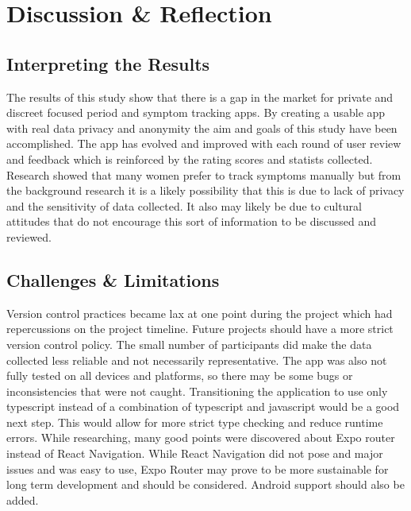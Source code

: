 \section{Discussion \& Reflection}

\subsection{Interpreting the Results}
The results of this study show that there is a gap in the market for private and discreet focused period and symptom tracking apps. By creating a usable app with real data privacy and anonymity the aim and goals of this study have been accomplished. The app has evolved and improved with each round of user review and feedback which is reinforced by the rating scores and statists collected. Research showed that many women prefer to track symptoms manually but from the background research it is a likely possibility that this is due to lack of privacy and the sensitivity of data collected. It also may likely be due to cultural attitudes that do not encourage this sort of information to be discussed and reviewed.

\subsection{Challenges \& Limitations}
Version control practices became lax at one point during the project which had repercussions on the project timeline. Future projects should have a more strict version control policy. The small number of participants did make the data collected less reliable and not necessarily representative. The app was also not fully tested on all devices and platforms, so there may be some bugs or inconsistencies that were not caught. Transitioning the application to use only typescript instead of a combination of typescript and javascript would be a good next step. This would allow for more strict type checking and reduce runtime errors. While researching, many good points were discovered about Expo router instead of React Navigation. While React Navigation did not pose and major issues and was easy to use, Expo Router may prove to be more sustainable for long term development and should be considered. Android support should also be added.

